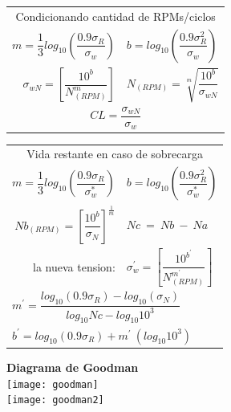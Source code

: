 \documentclass[11pt,a4paper]{article}
\begin{document}
\begin{multicols}{2}
\begin{cajita}
	
	
	
	\begin{tabular}{r l }
		\multicolumn{2}{c}{Condicionando cantidad de RPMs/ciclos}\\
		$m=\dfrac{1}{3}log_{10}\left(\dfrac{0.9\sigma_{R}}{\sigma_{w}}\right)$&
		$b=log_{10}\left(\dfrac{0.9\sigma_{R}^{2}}{\sigma_{w}}\right)$\\[0.5cm]
		$\sigma_{wN}=\left[\dfrac{10^{b}}{N_{(RPM)}^{m}}\right]$& $N_{(RPM)}=\sqrt[m]{\dfrac{10^{b}}{\sigma_{wN}}}$\\[0.5cm]
		\multicolumn{2}{c}{$CL=\dfrac{\sigma_{wN}}{\sigma_{w}}$}\\
	\end{tabular}

	\begin{tabular}{r l }
		\multicolumn{2}{c}{Vida restante en caso de sobrecarga}\\[0.2cm]
		$m=\dfrac{1}{3}log_{10}\left(\dfrac{0.9\sigma_{R}}{\sigma_{w}^{*}}\right)$&
		$b=log_{10}\left(\dfrac{0.9\sigma_{R}^{2}}{\sigma_{w}^{*}}\right)$\\[0.5cm]
		$Nb_{(RPM)}=\left[\dfrac{10^{b}}{\sigma_{N}}\right]^{\frac{1}{m}}$&$Nc~=~Nb~-~Na$\\
		la nueva tension: & $\sigma_{w}^{'}=\left[\dfrac{10^{b^{'}}}{N_{(RPM)}^{m^{'}}}\right]$\\[0.5cm]
		\multicolumn{2}{l}{$m^{'}=\dfrac{log_{10}(0.9\sigma_{R})-log_{10}(\sigma_{N})}{log_{10}Nc-log_{10}10^{3}}$}\\[0.3cm]
		\multicolumn{2}{l}{$b^{'}=log_{10}(0.9\sigma_{R})+m^{'}~(log_{10}10^{3})$}\\[0.25cm]
		
	\end{tabular}
\end{cajita}
\newpage
\begin{cajita}

	\textbf{Diagrama de Goodman}\\
\texttt{[image: goodman]}\\
\texttt{[image: goodman2]}\\


\end{cajita}
\end{multicols}
\end{document}

